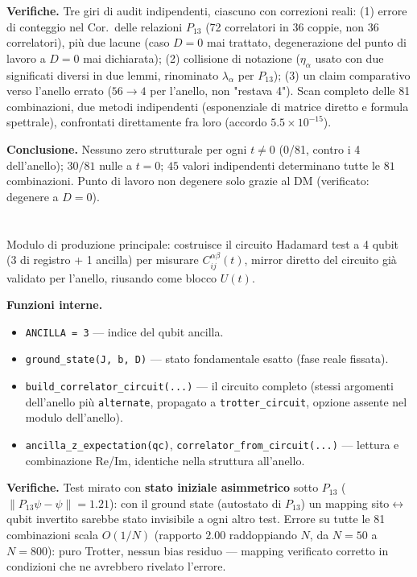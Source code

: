 \documentclass[11pt,a4paper]{article}
\begin{document}
\textbf{Verifiche.} Tre giri di audit indipendenti, ciascuno con correzioni reali: (1) errore di
conteggio nel Cor.\ delle relazioni $P_{13}$ (72 correlatori in 36 coppie, non 36 correlatori),
più due lacune (caso $D=0$ mai trattato, degenerazione del punto di lavoro a $D=0$ mai
dichiarata); (2) collisione di notazione ($\eta_\alpha$ usato con due significati diversi in due
lemmi, rinominato $\lambda_\alpha$ per $P_{13}$); (3) un claim comparativo verso l'anello errato
($56\to4$ per l'anello, non "restava 4"). Scan completo delle 81 combinazioni, due metodi
indipendenti (esponenziale di matrice diretto e formula spettrale), confrontati direttamente fra
loro (accordo $5.5\times10^{-15}$).

\textbf{Conclusione.} Nessuno zero strutturale per ogni $t\neq0$ (0/81, contro i 4 dell'anello);
$30/81$ nulle a $t=0$; $45$ valori indipendenti determinano tutte le $81$ combinazioni. Punto di
lavoro non degenere solo grazie al DM (verificato: degenere a $D=0$).

\section*{\texttt{}}

Modulo di produzione principale: costruisce il circuito Hadamard test a 4 qubit (3 di registro +
1 ancilla) per misurare $C_{ij}^{\alpha\beta}(t)$, mirror diretto del circuito già validato per
l'anello, riusando \texttt{} come blocco $U(t)$.

\textbf{Funzioni interne.}
\begin{itemize}
\item \texttt{ANCILLA = 3} — indice del qubit ancilla.
\item \texttt{ground\_state(J,\ b,\ D)} — stato fondamentale esatto (fase reale fissata).
\item \texttt{build\_correlator\_circuit(...)} — il circuito completo (stessi argomenti
dell'anello più \texttt{alternate}, propagato a \texttt{trotter\_circuit}, opzione assente nel
modulo dell'anello).
\item \texttt{ancilla\_z\_expectation(qc)}, \texttt{correlator\_from\_circuit(...)} — lettura e
combinazione Re/Im, identiche nella struttura all'anello.
\end{itemize}

\textbf{Verifiche.} Test mirato con \textbf{stato iniziale asimmetrico} sotto $P_{13}$
($\|P_{13}\psi-\psi\|=1.21$): con il ground state (autostato di $P_{13}$) un mapping
sito$\leftrightarrow$qubit invertito sarebbe stato invisibile a ogni altro test. Errore su tutte
le 81 combinazioni scala $O(1/N)$ (rapporto $2.00$ raddoppiando $N$, da $N{=}50$ a $N{=}800$):
puro Trotter, nessun bias residuo — mapping verificato corretto in condizioni che ne avrebbero
rivelato l'errore.
\end{document}
